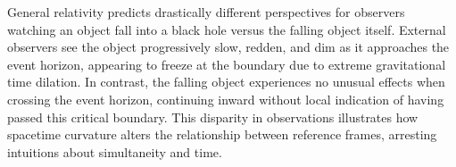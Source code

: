 General relativity predicts drastically different perspectives for observers watching an object fall into a black hole versus the falling object itself. External observers see the object progressively slow, redden, and dim as it approaches the event horizon, appearing to freeze at the boundary due to extreme gravitational time dilation. In contrast, the falling object experiences no unusual effects when crossing the event horizon, continuing inward without local indication of having passed this critical boundary. This disparity in observations illustrates how spacetime curvature alters the relationship between reference frames, arresting intuitions about simultaneity and time.
